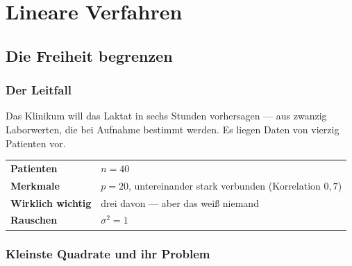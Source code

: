 \part{Lineare Verfahren}

\chapter{Die Freiheit begrenzen}

\section{Der Leitfall}

\begin{merksatz}
Das Klinikum will das Laktat in sechs Stunden vorhersagen --- aus zwanzig Laborwerten, die bei Aufnahme bestimmt werden. Es liegen Daten von vierzig Patienten vor.

\begin{center}
{\small
\renewcommand{\arraystretch}{1.5}
\begin{tabular}{@{}P{2.8cm}P{5.8cm}@{}}
\toprule
\textbf{Patienten} & $n = 40$\\
\textbf{Merkmale} & $p = 20$, untereinander stark verbunden (Korrelation $0{,}7$)\\
\textbf{Wirklich wichtig} & drei davon --- aber das weiß niemand\\
\textbf{Rauschen} & $\sigma^{2} = 1$\\
\bottomrule
\end{tabular}}
\end{center}

\begin{center}
\begin{minipage}{0.88\textwidth}
\end{minipage}
\end{center}
\end{merksatz}

\section{Kleinste Quadrate und ihr Problem}

